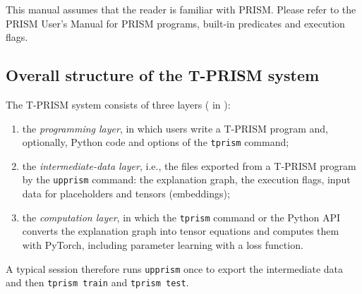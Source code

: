 \documentclass[a4paper]{report}
\begin{document}
This manual assumes that the reader is familiar with PRISM.  Please
refer to the PRISM User's Manual for PRISM programs, built-in predicates
and execution flags.

\subsection*{Overall structure of the T-PRISM system}
The T-PRISM system consists of three layers ( in
):
\begin{enumerate}
	\item the {\em programming layer}, in which users write a T-PRISM program
	and, optionally, Python code and options of the {\tt tprism} command;
	\item the {\em intermediate-data layer}, i.e., the files exported from a
	T-PRISM program by the {\tt upprism} command: the explanation graph, the
	execution flags, input data for placeholders and tensors (embeddings);
	\item the {\em computation layer}, in which the {\tt tprism} command or the
	Python API converts the explanation graph into tensor equations and computes
	them with PyTorch, including parameter learning with a loss function.
\end{enumerate}
A typical session therefore runs {\tt upprism} once to export the
intermediate data and then {\tt tprism train} and {\tt tprism test}.
\end{document}
